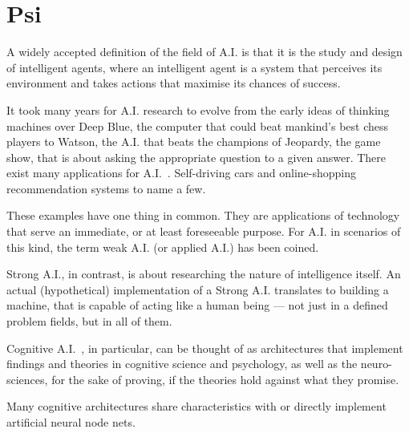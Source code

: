 \chapter{Psi}

A widely accepted definition of the field of A.I. is that it is the study and design of intelligent agents, where an intelligent agent is a system that perceives its environment and takes actions that maximise its chances of success. %

It took many years for A.I. research to evolve from the early ideas of thinking machines over Deep Blue, the computer that could beat mankind's best chess players to Watson, the A.I. that beats the champions of Jeopardy, the game show, that is about asking the appropriate question to a given answer. There exist many applications for A.I.~. Self-driving cars and online-shopping recommendation systems to name a few.

These examples have one thing in common. They are applications of technology that serve an immediate, or at least foreseeable purpose. For A.I. in scenarios of this kind, the term weak A.I. (or applied A.I.) has been coined.

Strong A.I., in contrast, is about researching the nature of intelligence itself. An actual (hypothetical) implementation of a Strong A.I. translates to building a machine, that is capable of acting like a human being --- not just in a defined problem fields, but in all of them.

Cognitive A.I.~, in particular, can be thought of as architectures that implement findings and theories in cognitive science and psychology, as well as the neuro-sciences, for the sake of proving, if the theories hold against what they promise. 


Many cognitive architectures share characteristics with or directly implement artificial neural node nets.


